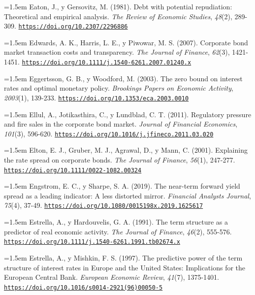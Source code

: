 \documentclass[10pt,a4paper]{article}
\begin{document}
\noindent\hangindent=1.5em Eaton, J., y Gersovitz, M. (1981). Debt with potential repudiation: Theoretical and empirical analysis. \textit{The Review of Economic Studies}, \textit{48}(2), 289-309. \href{https://doi.org/10.2307/2296886}{\nolinkurl{https://doi.org/10.2307/2296886}}

\noindent\hangindent=1.5em Edwards, A. K., Harris, L. E., y Piwowar, M. S. (2007). Corporate bond market transaction costs and transparency. \textit{The Journal of Finance}, \textit{62}(3), 1421-1451. \href{https://doi.org/10.1111/j.1540-6261.2007.01240.x}{\nolinkurl{https://doi.org/10.1111/j.1540-6261.2007.01240.x}}

\noindent\hangindent=1.5em Eggertsson, G. B., y Woodford, M. (2003). The zero bound on interest rates and optimal monetary policy. \textit{Brookings Papers on Economic Activity}, \textit{2003}(1), 139-233. \href{https://doi.org/10.1353/eca.2003.0010}{\nolinkurl{https://doi.org/10.1353/eca.2003.0010}}

\noindent\hangindent=1.5em Ellul, A., Jotikasthira, C., y Lundblad, C. T. (2011). Regulatory pressure and fire sales in the corporate bond market. \textit{Journal of Financial Economics}, \textit{101}(3), 596-620. \href{https://doi.org/10.1016/j.jfineco.2011.03.020}{\nolinkurl{https://doi.org/10.1016/j.jfineco.2011.03.020}}

\noindent\hangindent=1.5em Elton, E. J., Gruber, M. J., Agrawal, D., y Mann, C. (2001). Explaining the rate spread on corporate bonds. \textit{The Journal of Finance}, \textit{56}(1), 247-277. \href{https://doi.org/10.1111/0022-1082.00324}{\nolinkurl{https://doi.org/10.1111/0022-1082.00324}}

\noindent\hangindent=1.5em Engstrom, E. C., y Sharpe, S. A. (2019). The near-term forward yield spread as a leading indicator: A less distorted mirror. \textit{Financial Analysts Journal}, \textit{75}(4), 37-49. \href{https://doi.org/10.1080/0015198x.2019.1625617}{\nolinkurl{https://doi.org/10.1080/0015198x.2019.1625617}}

\noindent\hangindent=1.5em Estrella, A., y Hardouvelis, G. A. (1991). The term structure as a predictor of real economic activity. \textit{The Journal of Finance}, \textit{46}(2), 555-576. \href{https://doi.org/10.1111/j.1540-6261.1991.tb02674.x}{\nolinkurl{https://doi.org/10.1111/j.1540-6261.1991.tb02674.x}}

\noindent\hangindent=1.5em Estrella, A., y Mishkin, F. S. (1997). The predictive power of the term structure of interest rates in Europe and the United States: Implications for the European Central Bank. \textit{European Economic Review}, \textit{41}(7), 1375-1401. \href{https://doi.org/10.1016/s0014-2921(96)00050-5}{\nolinkurl{https://doi.org/10.1016/s0014-2921(96)00050-5}}
\end{document}
